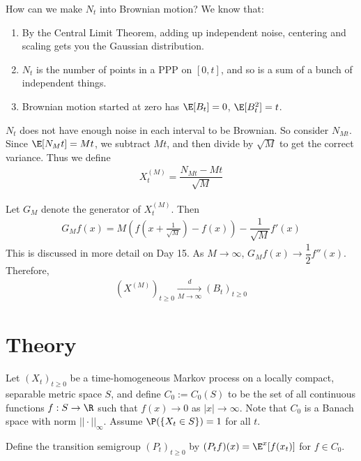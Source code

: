 \begin{exmp}{How can we make $N_t$ into Brownian motion?}
We know that:
\begin{enumerate}
\item By the Central Limit Theorem, adding up independent noise, centering and scaling gets you the Gaussian distribution. 
\item $N_t$ is the number of points in a PPP on $[0, t]$, and so is a sum of a bunch of independent things. 
\item Brownian motion started at zero has $\E[B_t] = 0$, $\E[B_t^2] = t$.
\end{enumerate}

$N_t$ does not have enough noise in each interval to be Brownian. So consider $N_{Mt}$. Since
$\E[N_Mt] = Mt$, we subtract $Mt$, and then divide by $\sqrt{M}$ to get the correct variance.
Thus we define
$$\begin{aligned}
X_t^{(M)} = \dfrac{ N_{Mt} - Mt}{\sqrt{M}}
\end{aligned}$$

Let $G_M$ denote the generator of $X_t^{(M)}$. Then
$$\begin{aligned}
G_M f(x) = M \left( f \left( x+ \frac{1}{\sqrt{M}}\right) - f(x) \right) - \dfrac{1}{\sqrt{M}} f'(x)
\end{aligned}$$
This is discussed in more detail on Day 15. 
As $M \to \infty$, $G_M f(x) \to \dfrac{1}{2} f''(x)$. 
Therefore, 
$$\begin{aligned}
(X^{(M)})_{t \geq 0} \xrightarrow[M \to \infty]{d} (B_t)_{t \geq 0}
\end{aligned}$$
\end{exmp}



\section{Theory}

Let $(X_t)_{t \geq 0}$ be a time-homogeneous Markov process on a locally compact, separable metric space $S$, 
and define
$C_0 := C_0(S)$ to be the set of all continuous functions $f: S \to \R$ such that $f(x) \to 0$ as $|x| \to \infty$. 
Note that $C_0$ is a Banach space with norm $|| \cdot ||_{\infty}$. Assume $\P(\{X_t \in S \}) = 1$ for all $t$. 

\begin{defn}
Define the transition semigroup $(P_t)_{t \geq 0}$ by $(P_t f)(x) = \E^{x}[f(x_t)]$ for $f \in C_0$. 
\end{defn}

